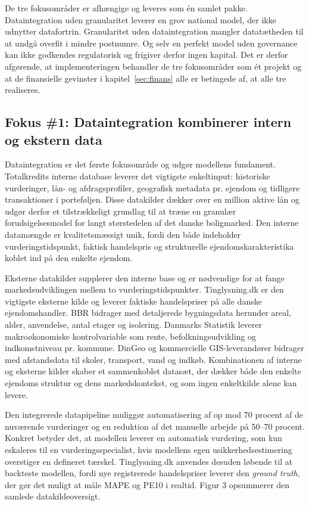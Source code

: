 \documentclass[12pt]{article}
\begin{document}
De tre fokusområder er afhængige og leveres som én samlet pakke. Dataintegration uden granularitet leverer en grov national model, der ikke udnytter datafortrin. Granularitet uden dataintegration mangler datatætheden til at undgå overfit i mindre postnumre. Og selv en perfekt model uden governance kan ikke godkendes regulatorisk og frigiver derfor ingen kapital. Det er derfor afgørende, at implementeringen behandler de tre fokusområder som ét projekt og at de finansielle gevinster i kapitel~\ref{sec:finans} alle er betingede af, at alle tre realiseres.

\subsection{Fokus \#1: Dataintegration kombinerer intern og ekstern data}
\label{sec:res-data}
Dataintegration er det første fokusområde og udgør modellens fundament. Totalkredits interne database leverer det vigtigste enkeltinput: historiske vurderinger, lån- og afdragsprofiler, geografisk metadata pr. ejendom og tidligere transaktioner i porteføljen. Disse datakilder dækker over en million aktive lån og udgør derfor et tilstrækkeligt grundlag til at træne en granulær forudsigelsesmodel for langt størstedelen af det danske boligmarked. Den interne datamængde er kvalitetsmæssigt unik, fordi den både indeholder vurderingstidspunkt, faktisk handelspris og strukturelle ejendomskarakteristika koblet ind på den enkelte ejendom.

Eksterne datakilder supplerer den interne base og er nødvendige for at fange markedsudviklingen mellem to vurderingstidspunkter. Tinglysning.dk er den vigtigste eksterne kilde og leverer faktiske handelspriser på alle danske ejendomshandler. BBR bidrager med detaljerede bygningsdata herunder areal, alder, anvendelse, antal etager og isolering. Danmarks Statistik leverer makroøkonomiske kontrolvariable som rente, befolkningsudvikling og indkomstniveau pr. kommune. DinGeo og kommercielle GIS-leverandører bidrager med afstandsdata til skoler, transport, vand og indkøb. Kombinationen af interne og eksterne kilder skaber et sammenkoblet datasæt, der dækker både den enkelte ejendoms struktur og dens markedskontekst, og som ingen enkeltkilde alene kan levere.

Den integrerede datapipeline muliggør automatisering af op mod 70 procent af de nuværende vurderinger og en reduktion af det manuelle arbejde på 50--70 procent. Konkret betyder det, at modellen leverer en automatisk vurdering, som kun eskaleres til en vurderingsspecialist, hvis modellens egen usikkerhedsestimering overstiger en defineret tærskel. Tinglysning.dk anvendes desuden løbende til at backteste modellen, fordi nye registrerede handelspriser leverer den \textit{ground truth}, der gør det muligt at måle MAPE og PE10 i realtid. Figur 3 opsummerer den samlede datakildeoversigt.
\end{document}
